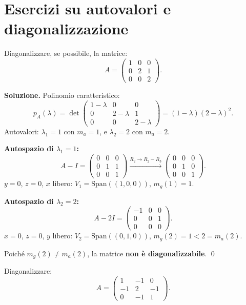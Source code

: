 \section[Autovalori]{Esercizi su autovalori e diagonalizzazione}
\label{sec:es-autovalori}

\begin{examplebox}
Diagonalizzare, se possibile, la matrice:
\[ A = \begin{pmatrix} 1 & 0 & 0 \\ 0 & 2 & 1 \\ 0 & 0 & 2 \end{pmatrix}. \]
\end{examplebox}

\textbf{Soluzione.} Polinomio caratteristico:
\[ p_A(\lambda) = \det\begin{pmatrix} 1-\lambda & 0 & 0 \\ 0 & 2-\lambda & 1 \\ 0 & 0 & 2-\lambda \end{pmatrix} = (1-\lambda)(2-\lambda)^2. \]
Autovalori: $\lambda_1 = 1$ con $m_a = 1$, e $\lambda_2 = 2$ con $m_a = 2$.

\textbf{Autospazio di $\lambda_1 = 1$:}
\[ A - I = \begin{pmatrix} 0 & 0 & 0 \\ 0 & 1 & 1 \\ 0 & 0 & 1 \end{pmatrix} \xrightarrow{R_2 \to R_2 - R_3} \begin{pmatrix} 0 & 0 & 0 \\ 0 & 1 & 0 \\ 0 & 0 & 1 \end{pmatrix}. \]
$y = 0$, $z = 0$, $x$ libero: $V_1 = \text{Span}((1,0,0))$, $m_g(1) = 1$. \checkmark

\textbf{Autospazio di $\lambda_2 = 2$:}
\[ A - 2I = \begin{pmatrix} -1 & 0 & 0 \\ 0 & 0 & 1 \\ 0 & 0 & 0 \end{pmatrix}. \]
$x = 0$, $z = 0$, $y$ libero: $V_2 = \text{Span}((0,1,0))$, $m_g(2) = 1 < 2 = m_a(2)$.

Poiché $m_g(2) \neq m_a(2)$, la matrice \textbf{non è diagonalizzabile}. \qed

\medskip

\begin{examplebox}
Diagonalizzare:
\[ A = \begin{pmatrix} 1 & -1 & 0 \\ -1 & 2 & -1 \\ 0 & -1 & 1 \end{pmatrix}. \]
\end{examplebox}

